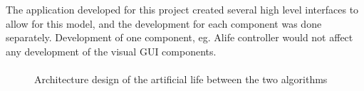 \documentclass[12pt]{article}
\begin{document}
The application developed for this project created several high level interfaces to allow for this model, and the development for each
component was done separately. Development of one component, eg. Alife controller would not affect any development of the visual 
GUI components.

\paragraph{}


\begin{figure} [ht]
\centering
{}
\caption{Architecture design of the artificial life between the two algorithms}
\label{fig:mvc}
\end{figure}
\end{document}
